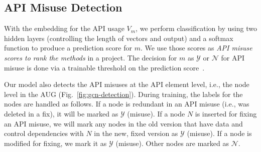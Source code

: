 \subsection{API Misuse Detection}


With the embedding for the API usage $V_m$, we perform classification
by using two hidden layers (controlling the length of vectors and
output) and a softmax function to produce a prediction score for
$m$. We use those scores as {\em API misuse scores to rank the
  methods} in a project. The decision for $m$ as $\mathcal{Y}$ or
$\mathcal{N}$ for API misuse is done via a trainable threshold on the
prediction score~\cite{li2018vuldeepecker,li2019improving}.

Our model also detects the API misuses at the API element level, i.e.,
the node level in the AUG (Fig.~\ref{fig:gcn-detection}). During
training, the labels for the nodes are handled as follows. If a node
is redundant in an API misuse (i.e., was deleted in a fix), it will be
marked as $\mathcal{Y}$ (misuse). If a node $N$ is inserted for fixing
an API misuse, we will mark any nodes in the old version that have
data and control dependencies with $N$ in the new, fixed version as
$\mathcal{Y}$ (misuse). If a node is modified for fixing, we mark it
as $\mathcal{Y}$ (misuse). Other nodes are marked as
$\mathcal{N}$.
